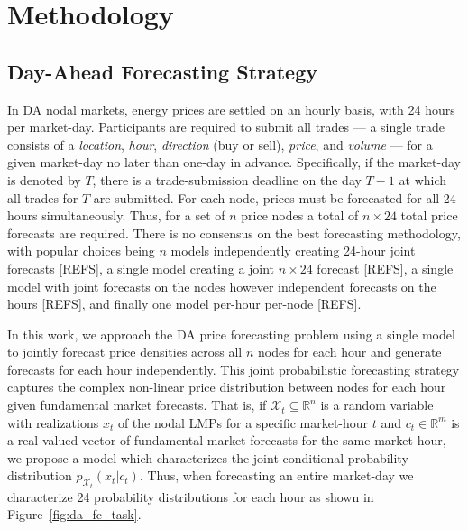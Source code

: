 \chapter{Methodology}\label{ch:methodology}

\section{Day-Ahead Forecasting Strategy}\label{sec:proposed-methods}

In DA nodal markets, energy prices are settled on an hourly basis, with 24 hours per market-day.
Participants are required to submit all trades --- a single trade consists of a \textit{location}, \textit{hour},
\textit{direction} (buy or sell), \textit{price}, and \textit{volume} --- for a given market-day no later than one-day
in advance.
Specifically, if the market-day is denoted by $T$, there is a trade-submission deadline on the day $T-1$ at which all
trades for $T$ are submitted.
For each node, prices must be forecasted for all 24 hours simultaneously.
Thus, for a set of $n$ price nodes a total of $n \times 24$ total price forecasts are required.
There is no consensus on the best forecasting methodology, with popular choices being $n$ models independently
creating 24-hour joint forecasts [REFS], a single model creating a joint $n \times 24$ forecast [REFS], a single model
with joint forecasts on the nodes however independent forecasts on the hours [REFS], and finally one model per-hour
per-node [REFS].

In this work, we approach the DA price forecasting problem using a single model to jointly forecast price densities
across all $n$ nodes for each hour and generate forecasts for each hour independently.
This joint probabilistic forecasting strategy captures the complex non-linear price distribution between nodes for each
hour given fundamental market forecasts.
That is, if $\mathcal{X}_t \subseteq \mathbb{R}^n$ is a random variable with realizations $x_t$ of the nodal LMPs for a
specific market-hour $t$ and $c_t \in \mathbb{R}^m$ is a real-valued vector of fundamental market forecasts for the
same market-hour, we propose a model which characterizes the joint conditional probability distribution
 $p_{\mathcal{X}_t}(x_t | c_t)$.
Thus, when forecasting an entire market-day we characterize 24 probability distributions for each hour as shown in
Figure~\ref{fig:da_fc_task}.

